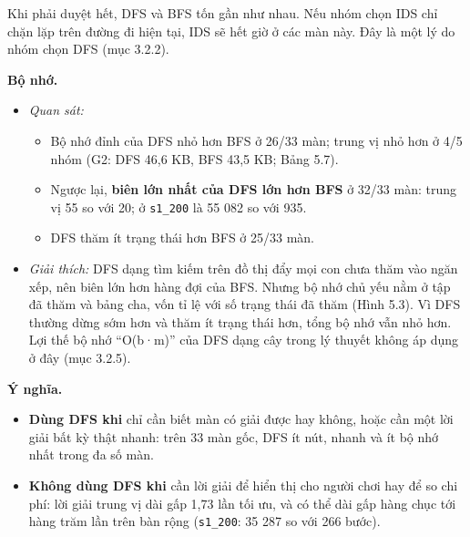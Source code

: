 Khi phải duyệt hết, DFS và BFS tốn gần như nhau. Nếu nhóm chọn IDS chỉ chặn lặp trên đường đi hiện tại, IDS sẽ hết giờ ở các màn này. Đây là một lý do nhóm chọn DFS (mục 3.2.2).

\textbf{Bộ nhớ.}

\begin{itemize}
\tightlist
\item
  \emph{Quan sát:}

  \begin{itemize}
  \tightlist
  \item
    Bộ nhớ đỉnh của DFS nhỏ hơn BFS ở 26/33 màn; trung vị nhỏ hơn ở 4/5 nhóm (G2: DFS 46,6 KB, BFS 43,5 KB; Bảng 5.7).
  \item
    Ngược lại, \textbf{biên lớn nhất của DFS lớn hơn BFS} ở 32/33 màn: trung vị 55 so với 20; ở \texttt{s1\_\allowbreak{}200} là 55 082 so với 935.
  \item
    DFS thăm ít trạng thái hơn BFS ở 25/33 màn.
  \end{itemize}
\item
  \emph{Giải thích:} DFS dạng tìm kiếm trên đồ thị đẩy mọi con chưa thăm vào ngăn xếp, nên biên lớn hơn hàng đợi của BFS. Nhưng bộ nhớ chủ yếu nằm ở tập đã thăm và bảng cha, vốn tỉ lệ với số trạng thái đã thăm (Hình 5.3). Vì DFS thường dừng sớm hơn và thăm ít trạng thái hơn, tổng bộ nhớ vẫn nhỏ hơn. Lợi thế bộ nhớ ``O(b·m)'' của DFS dạng cây trong lý thuyết không áp dụng ở đây (mục 3.2.5).
\end{itemize}

\textbf{Ý nghĩa.}

\begin{itemize}
\tightlist
\item
  \textbf{Dùng DFS khi} chỉ cần biết màn có giải được hay không, hoặc cần một lời giải bất kỳ thật nhanh: trên 33 màn gốc, DFS ít nút, nhanh và ít bộ nhớ nhất trong đa số màn.
\item
  \textbf{Không dùng DFS khi} cần lời giải để hiển thị cho người chơi hay để so chi phí: lời giải trung vị dài gấp 1,73 lần tối ưu, và có thể dài gấp hàng chục tới hàng trăm lần trên bàn rộng (\texttt{s1\_\allowbreak{}200}: 35 287 so với 266 bước).
\end{itemize}
